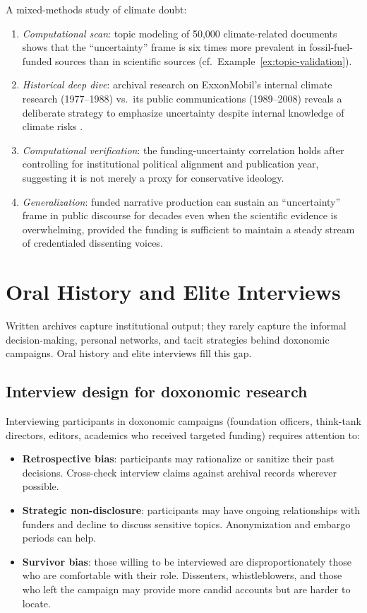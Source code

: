 \begin{example}
\label{ex:mixed-methods}
A mixed-methods study of climate doubt:
\begin{enumerate}[nosep]
  \item \emph{Computational scan}: topic modeling of 50,000 climate-related documents shows that the ``uncertainty'' frame is six times more prevalent in fossil-fuel-funded sources than in scientific sources (cf.\ Example~\ref{ex:topic-validation}).
  \item \emph{Historical deep dive}: archival research on ExxonMobil's internal climate research (1977--1988) vs.\ its public communications (1989--2008) reveals a deliberate strategy to emphasize uncertainty despite internal knowledge of climate risks \autocite{oreskes2010}.
  \item \emph{Computational verification}: the funding-uncertainty correlation holds after controlling for institutional political alignment and publication year, suggesting it is not merely a proxy for conservative ideology.
  \item \emph{Generalization}: funded narrative production can sustain an ``uncertainty'' frame in public discourse for decades even when the scientific evidence is overwhelming, provided the funding is sufficient to maintain a steady stream of credentialed dissenting voices.
\end{enumerate}
\end{example}

\section{Oral History and Elite Interviews}
\label{sec:ch18-oral}

Written archives capture institutional output; they rarely capture the informal decision-making, personal networks, and tacit strategies behind doxonomic campaigns.
Oral history and elite interviews fill this gap.

\subsection{Interview design for doxonomic research}

Interviewing participants in doxonomic campaigns (foundation officers, think-tank directors, editors, academics who received targeted funding) requires attention to:
\begin{itemize}[nosep]
  \item \textbf{Retrospective bias}: participants may rationalize or sanitize their past decisions.
  Cross-check interview claims against archival records wherever possible.
  \item \textbf{Strategic non-disclosure}: participants may have ongoing relationships with funders and decline to discuss sensitive topics.
  Anonymization and embargo periods can help.
  \item \textbf{Survivor bias}: those willing to be interviewed are disproportionately those who are comfortable with their role.
  Dissenters, whistleblowers, and those who left the campaign may provide more candid accounts but are harder to locate.
\end{itemize}

